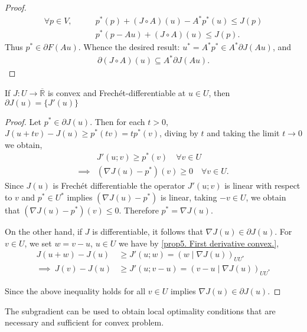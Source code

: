 \begin{theorem}
\begin{proof}
\begin{align*}
	\forall p \in V, \qquad &p^*(p)+(J\circ A)(u) - A^*p^*(u) \leq J(p) \\
	& p^*(p-Au) + (J\circ A)(u)\leq J(p).
\end{align*}
Thus $p^* \in \partial F(Au)$. Whence the desired result: $u^*= A^*p^* \in A^*\partial J (Au)$, and
\begin{align*}
	\partial (J\circ A)(u)\subseteq A^* \partial J(Au).
\end{align*}
\end{proof}
\end{theorem}

\begin{theorem}
	If $J: U\rightarrow \overline{\mathbb{R}}$ is convex and Frech\'et-differentiable at $u\in U$, then $\partial J(u)=\lbrace J'(u)\rbrace$
	
	\begin{proof}
		Let $p^* \in \partial J(u)$. Then for each $t>0$, $J(u+tv)-J(u)\geq p^*(tv)=tp^*(v)$, diving by $t$ and taking the limit $t\rightarrow 0$ we obtain,
		\begin{align*}
			&J'(u;v) \geq p^*(v) \quad \forall v \in U \\
	\implies& (\nabla J(u)-p^*)(v) \geq 0 \quad \forall v \in U.
		\end{align*}
	Since $J(u)$ is Frech\'et differentiable the operator $J'(u;v)$ is linear with respect to $v$ and $p^* \in U^*$ implies $(\nabla J(u)-p^*)$ is linear, taking $-v \in U$, we obtain that $(\nabla J(u)-p^*)(v)\leq 0$. Therefore $p^*=\nabla J(u)$.
	
	On the other hand, if $J$ is differentiable, it follows that $\nabla J(u)\in \partial J(u)$. For $v\in U$, we set $w=v-u$, $u\in U$ we have by \eqref{prop5. First derivative convex.}, 
	\begin{align*}
		    J(u+w)-J(u)&\geq J'(u;w)=\left(w\mid \nabla J(u)\right)_{UU^*} \\
	\implies \ J(v)-J(u)&\geq J'(u; v-u) = \left(v-u \mid \nabla J(u)\right)_{UU^*}
	\end{align*}
	
	Since the above inequality holds for all $v \in U$ implies $\nabla J(u) \in \partial J(u)$.
	\end{proof}
\end{theorem}
\begin{remark}
	The subgradient can be used to obtain local optimality conditions that are necessary and sufficient for convex problem.
\end{remark}

